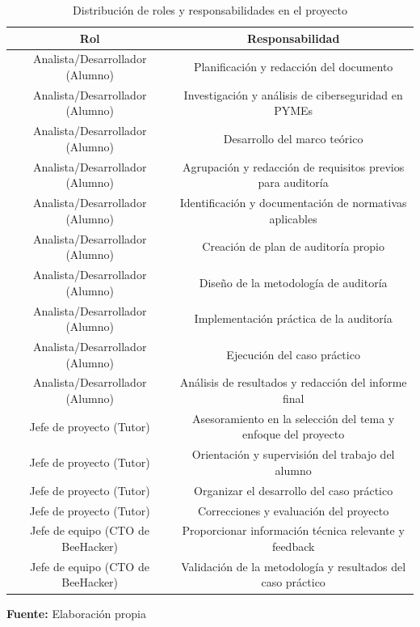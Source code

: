 \documentclass[a4paper, 11pt]{article}
\begin{document}
\begin{table}[H]
    \centering
    \caption{Distribución de roles y responsabilidades en el proyecto}
    \begin{tabular}{|c|c|}

        \hline
        \textbf{Rol} & \textbf{Responsabilidad} \\
        \hline
        Analista/Desarrollador (Alumno) & Planificación y redacción del documento \\
        \hline
        Analista/Desarrollador (Alumno) & Investigación y análisis de ciberseguridad en PYMEs \\
        \hline
        Analista/Desarrollador (Alumno) & Desarrollo del marco teórico \\
        \hline
        Analista/Desarrollador (Alumno) & Agrupación y redacción de requisitos previos para auditoría \\
        \hline
        Analista/Desarrollador (Alumno) & Identificación y documentación de normativas aplicables \\
        \hline
        Analista/Desarrollador (Alumno) & Creación de plan de auditoría propio \\
        \hline
        Analista/Desarrollador (Alumno) & Diseño de la metodología de auditoría \\
        \hline
        Analista/Desarrollador (Alumno) & Implementación práctica de la auditoría \\
        \hline
        Analista/Desarrollador (Alumno) & Ejecución del caso práctico \\
        \hline
        Analista/Desarrollador (Alumno) & Análisis de resultados y redacción del informe final \\
        \hline
        Jefe de proyecto (Tutor) & Asesoramiento en la selección del tema y enfoque del proyecto \\
        \hline
        Jefe de proyecto (Tutor) & Orientación y supervisión del trabajo del alumno \\
        \hline
        Jefe de proyecto (Tutor) & Organizar el desarrollo del caso práctico \\
        \hline
        Jefe de proyecto (Tutor) & Correcciones y evaluación del proyecto \\
        \hline
        Jefe de equipo (CTO de BeeHacker) & Proporcionar información técnica relevante y feedback \\
        \hline
        Jefe de equipo (CTO de BeeHacker) & Validación de la metodología y resultados del caso práctico \\
        \hline

    \end{tabular}
    \begin{flushleft}\centering
        \footnotesize \textbf{Fuente:} Elaboración propia
    \end{flushleft}    
    \label{tab:distribucion_roles}
\end{table}
\end{document}
